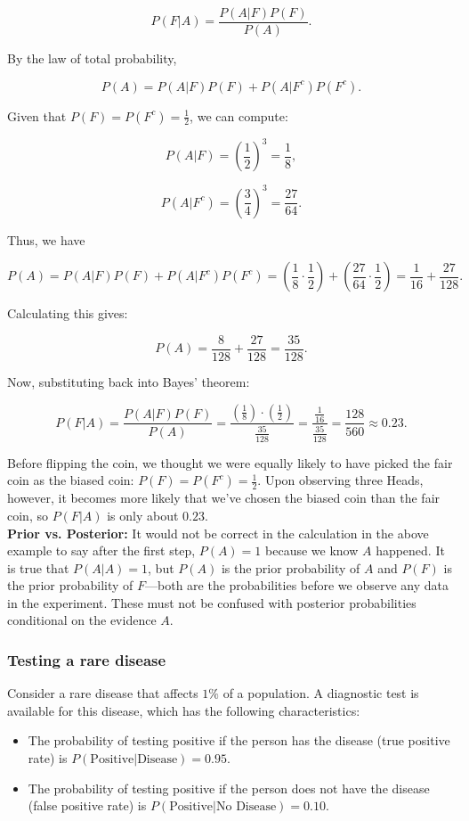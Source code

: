 \[
P(F | A) = \frac{P(A | F) P(F)}{P(A)}.
\]

By the law of total probability, 

\[
P(A) = P(A | F) P(F) + P(A | F^c) P(F^c).
\]

Given that \( P(F) = P(F^c) = \frac{1}{2} \), we can compute:

\[
P(A | F) = \left(\frac{1}{2}\right)^3 = \frac{1}{8},
\]

\[
P(A | F^c) = \left(\frac{3}{4}\right)^3 = \frac{27}{64}.
\]

Thus, we have

\[
P(A) = P(A | F) P(F) + P(A | F^c) P(F^c) = \left(\frac{1}{8} \cdot \frac{1}{2}\right) + \left(\frac{27}{64} \cdot \frac{1}{2}\right) = \frac{1}{16} + \frac{27}{128}.
\]

Calculating this gives:

\[
P(A) = \frac{8}{128} + \frac{27}{128} = \frac{35}{128}.
\]

Now, substituting back into Bayes' theorem:

\[
P(F | A) = \frac{P(A | F) P(F)}{P(A)} = \frac{\left(\frac{1}{8}\right) \cdot \left(\frac{1}{2}\right)}{\frac{35}{128}} = \frac{\frac{1}{16}}{\frac{35}{128}} = \frac{128}{560} \approx 0.23.
\]

Before flipping the coin, we thought we were equally likely to have picked the fair coin as the biased coin: \( P(F) = P(F^c) = \frac{1}{2} \). Upon observing three Heads, however, it becomes more likely that we’ve chosen the biased coin than the fair coin, so \( P(F | A) \) is only about \( 0.23 \). \\

\textbf{Prior vs. Posterior:} It would not be correct in the calculation in the above example to say after the first step, \( P(A) = 1 \) because we know \( A \) happened. It is true that \( P(A|A) = 1 \), but \( P(A) \) is the prior probability of \( A \) and \( P(F) \) is the prior probability of \( F \)—both are the probabilities before we observe any data in the experiment. These must not be confused with posterior probabilities conditional on the evidence \( A \).

\subsubsection{Testing a rare disease}

Consider a rare disease that affects \(1\%\) of a population. A diagnostic test is available for this disease, which has the following characteristics:
\begin{itemize}
    \item The probability of testing positive if the person has the disease (true positive rate) is \(P(\text{Positive} | \text{Disease}) = 0.95\).
    \item The probability of testing positive if the person does not have the disease (false positive rate) is \(P(\text{Positive} | \text{No Disease}) = 0.10\).
\end{itemize}

